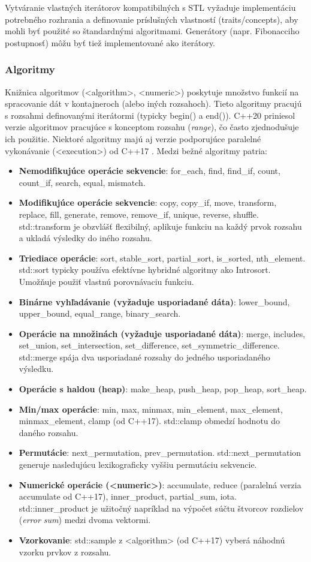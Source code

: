 \documentclass[11pt]{article}
\begin{document}
Vytváranie vlastných iterátorov kompatibilných s STL vyžaduje implementáciu potrebného rozhrania a definovanie príslušných vlastností (traits/concepts), aby mohli byť použité so štandardnými algoritmami. Generátory (napr. Fibonacciho postupnosť) môžu byť tiež implementované ako iterátory.

\subsubsection{Algoritmy}

Knižnica algoritmov (<algorithm>, <numeric>) poskytuje množstvo funkcií na spracovanie dát v kontajneroch (alebo iných rozsahoch). Tieto algoritmy pracujú s rozsahmi definovanými iterátormi (typicky begin() a end()). C++20 priniesol verzie algoritmov pracujúce s konceptom rozsahu (\textit{range}), čo často zjednodušuje ich použitie. Niektoré algoritmy majú aj verzie podporujúce paralelné vykonávanie (<execution>) od C++17 \cite{10162792}. Medzi bežné algoritmy patria:

\begin{itemize}
  \item \textbf{Nemodifikujúce operácie sekvencie}: for\_each, find, find\_if, count, count\_if, search, equal, mismatch.
  \item \textbf{Modifikujúce operácie sekvencie}: copy, copy\_if, move, transform, replace, fill, generate, remove, remove\_if, unique, reverse, shuffle. std::transform je obzvlášť flexibilný, aplikuje funkciu na každý prvok rozsahu a ukladá výsledky do iného rozsahu.
  \item \textbf{Triediace operácie}: sort, stable\_sort, partial\_sort, is\_sorted, nth\_element. std::sort typicky používa efektívne hybridné algoritmy ako Introsort. Umožňuje použiť vlastnú porovnávaciu funkciu.
  \item \textbf{Binárne vyhľadávanie (vyžaduje usporiadané dáta)}: lower\_bound, upper\_bound, equal\_range, binary\_search.
  \item \textbf{Operácie na množinách (vyžaduje usporiadané dáta)}: merge, includes, set\_union, set\_intersection, set\_difference, set\_symmetric\_difference. std::merge spája dva usporiadané rozsahy do jedného usporiadaného výsledku.
  \item \textbf{Operácie s haldou (heap)}: make\_heap, push\_heap, pop\_heap, sort\_heap.
  \item \textbf{Min/max operácie}: min, max, minmax, min\_element, max\_element, minmax\_element, clamp (od C++17). std::clamp obmedzí hodnotu do daného rozsahu.
  \item \textbf{Permutácie}: next\_permutation, prev\_permutation. std::next\_permutation generuje nasledujúcu lexikograficky vyššiu permutáciu sekvencie.
  \item \textbf{Numerické operácie (<numeric>)}: accumulate, reduce (paralelná verzia accumulate od C++17), inner\_product, partial\_sum, iota. std::inner\_product je užitočný napríklad na výpočet súčtu štvorcov rozdielov (\textit{error sum}) medzi dvoma vektormi.
  \item \textbf{Vzorkovanie}: std::sample z <algorithm> (od C++17) vyberá náhodnú vzorku prvkov z rozsahu.
\end{itemize}
\end{document}

